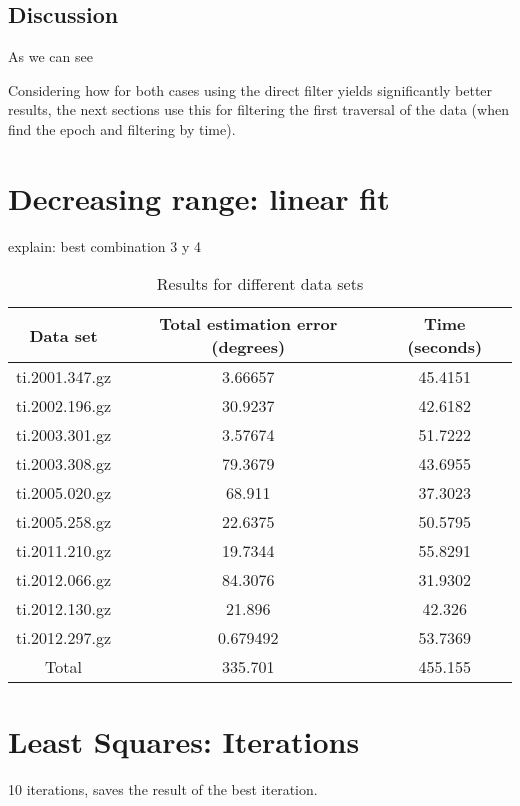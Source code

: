 \subsection{Discussion}

As we can see

Considering how for both cases using the direct filter yields significantly better results, the next sections use this for filtering the first traversal of the data (when find the epoch and filtering by time).

\section{Decreasing range: linear fit}

explain: best combination 3 y 4

\begin{table}[h!]
	\centering
	\def\arraystretch{1.2}
	\begin{tabular}{|c c c|} 
		\hline
		Data set & Total estimation error (degrees) & Time (seconds) \\ [0.5ex] 
		\hline\hline
		ti.2001.347.gz & 3.66657 & 45.4151 \\
		\hline
		ti.2002.196.gz & 30.9237 & 42.6182 \\
		\hline
		ti.2003.301.gz & 3.57674 & 51.7222 \\
		\hline
		ti.2003.308.gz & 79.3679 & 43.6955 \\
		\hline
		ti.2005.020.gz & 68.911 & 37.3023 \\
		\hline
		ti.2005.258.gz & 22.6375 & 50.5795 \\
		\hline
		ti.2011.210.gz & 19.7344 & 55.8291 \\
		\hline
		ti.2012.066.gz & 84.3076 & 31.9302 \\
		\hline
		ti.2012.130.gz & 21.896 & 42.326 \\
		\hline
		ti.2012.297.gz & 0.679492 & 53.7369 \\
		\hline
		Total & 335.701 & 455.155 \\
		\hline
	\end{tabular}
	\caption{Results for different data sets}
\end{table}

\section{Least Squares: Iterations}

10 iterations, saves the result of the best iteration.

